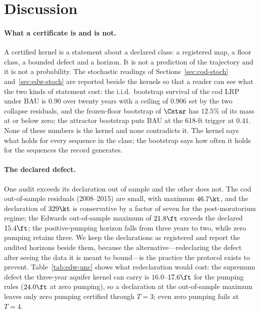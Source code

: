 \section{Discussion}\label{sec:discussion}

\paragraph{What a certificate is and is not.}
A certified kernel is a statement about a declared class: a registered map, a floor class, a bounded defect and a horizon. It is not a prediction of the trajectory and it is not a probability. The stochastic readings of Sections~\ref{sec:cod-stoch} and~\ref{sec:edw-stoch} are reported beside the kernels so that a reader can see what the two kinds of statement cost: the i.i.d.\ bootstrap survival of the cod LRP under BAU is $0.90$ over twenty years with a ceiling of $0.906$ set by the two collapse residuals, and the frozen-floor bootstrap of $\Cstar$ has $12.5\%$ of its mass at or below zero; the attractor bootstrap puts BAU at the 618-ft trigger at $0.41$. None of these numbers is the kernel and none contradicts it. The kernel says what holds for every sequence in the class; the bootstrap says how often it holds for the sequences the record generates.

\paragraph{The declared defect.}
One audit exceeds its declaration out of sample and the other does not. The cod out-of-sample residuals (2008--2015) are small, with maximum $46.7\kt$, and the declaration of $329\kt$ is conservative by a factor of seven for the post-moratorium regime; the Edwards out-of-sample maximum of $21.8\ft$ exceeds the declared $15.4\ft$; the positive-pumping horizon falls from three years to two, while zero pumping retains three. We keep the declarations as registered and report the audited horizons beside them, because the alternative---redeclaring the defect after seeing the data it is meant to bound---is the practice the protocol exists to prevent. Table~\ref{tab:edw-unc} shows what redeclaration would cost: the supremum defect the three-year aquifer kernel can carry is $16.0$--$17.6\ft$ for the pumping rules ($24.0\ft$ at zero pumping), so a declaration at the out-of-sample maximum leaves only zero pumping certified through $T=3$; even zero pumping fails at $T=4$.

